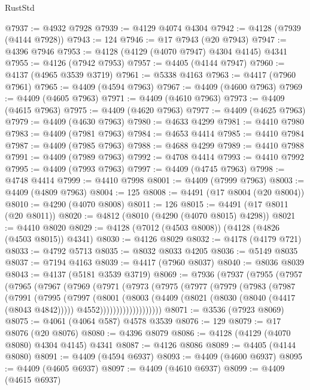 \begin{lexlean}{RustStd}
\begin{coremodule}
@7937 := @4932 @7928
@7939 := @4129 @4074 @4304
@7942 := @4128 (@7939 (@4144 @7928))
@7943 := 124
@7946 := @17 @7943 (@20 @7943)
@7947 := @4396 @7946
@7953 := @4128 (@4129 (@4070 @7947) @4304 @4145) @4341
@7955 := @4126 (@7942 @7953)
@7957 := @4405 (@4144 @7947)
@7960 := @4137 (@4965 @3539 @3719)
@7961 := @5338 @4163
@7963 := @4417 (@7960 @7961)
@7965 := @4409 (@4594 @7963)
@7967 := @4409 (@4600 @7963)
@7969 := @4409 (@4605 @7963)
@7971 := @4409 (@4610 @7963)
@7973 := @4409 (@4615 @7963)
@7975 := @4409 (@4620 @7963)
@7977 := @4409 (@4625 @7963)
@7979 := @4409 (@4630 @7963)
@7980 := @4633 @4299
@7981 := @4410 @7980
@7983 := @4409 (@7981 @7963)
@7984 := @4653 @4414
@7985 := @4410 @7984
@7987 := @4409 (@7985 @7963)
@7988 := @4688 @4299
@7989 := @4410 @7988
@7991 := @4409 (@7989 @7963)
@7992 := @4708 @4414
@7993 := @4410 @7992
@7995 := @4409 (@7993 @7963)
@7997 := @4409 (@4745 @7963)
@7998 := @4748 @4414
@7999 := @4410 @7998
@8001 := @4409 (@7999 @7963)
@8003 := @4409 (@4809 @7963)
@8004 := 125
@8008 := @4491 (@17 @8004 (@20 @8004))
@8010 := @4290 (@4070 @8008)
@8011 := 126
@8015 := @4491 (@17 @8011 (@20 @8011))
@8020 := @4812 (@8010 (@4290 (@4070 @8015) @4298))
@8021 := @4410 @8020
@8029 := @4128 (@7012 (@4503 @8008)) (@4128 (@4826 (@4503 @8015)) @4341)
@8030 := @4126 @8029
@8032 := @4178 (@4179 @721)
@8033 := @4792 @5713
@8035 := @8032 @8033 @4205
@8036 := @5149 @8035
@8037 := @7194 @4163
@8039 := @4417 (@7960 @8037)
@8040 := @8036 @8039
@8043 := @4137 (@5181 @3539 @3719)
@8069 := @7936
    (@7937
      (@7955
        (@7957
          (@7965
            (@7967
              (@7969
                (@7971
                  (@7973
                    (@7975
                      (@7977
                        (@7979
                          (@7983
                            (@7987
                              (@7991
                                (@7995
                                  (@7997
                                    (@8001
                                      (@8003
                                        (@4409
                                          (@8021 (@8030 (@8040 (@4417 (@8043 @4842)))))
                                          @4552)))))))))))))))))))
@8071 := @3536 (@7923 @8069)
@8075 := @4061 (@4064 @587) @4578 @3539
@8076 := 129
@8079 := @17 @8076 (@20 @8076)
@8080 := @4396 @8079
@8086 := @4128 (@4129 (@4070 @8080) @4304 @4145) @4341
@8087 := @4126 @8086
@8089 := @4405 (@4144 @8080)
@8091 := @4409 (@4594 @6937)
@8093 := @4409 (@4600 @6937)
@8095 := @4409 (@4605 @6937)
@8097 := @4409 (@4610 @6937)
@8099 := @4409 (@4615 @6937)

\end{coremodule}
\end{lexlean}
